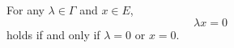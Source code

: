 For any $\lambda \in \Gamma$ and $x \in E$,
$$\lambda x = 0$$
holds if and only if $\lambda = 0$ or $x = 0$.
